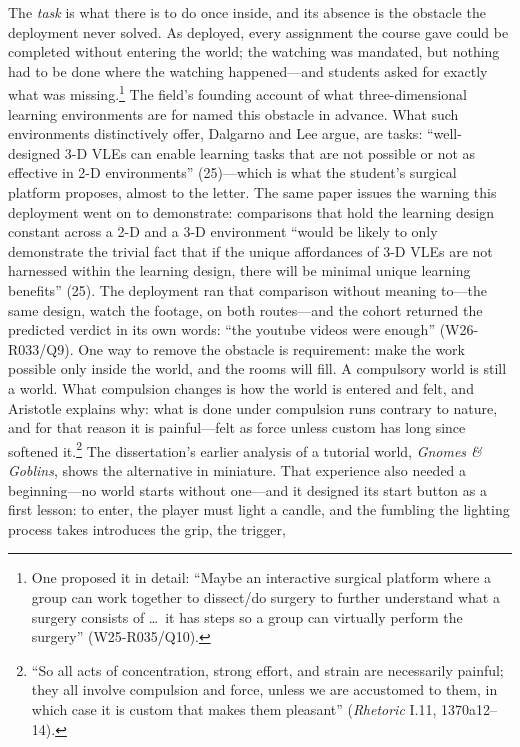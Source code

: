 The \textit{task} is what there is to do once inside, and its absence
is the obstacle the deployment never solved. As deployed, every
assignment the course gave could be completed without entering the
world; the watching was mandated, but nothing had to be done where the
watching happened---and students asked for exactly what was
missing.\footnote{One proposed it in detail: ``Maybe an interactive
surgical platform where a group can work together to dissect/do
surgery to further understand what a surgery consists of \ldots\ it
has steps so a group can virtually perform the surgery''
(W25-R035/Q10).} The field's founding account of what
three-dimensional learning environments are for named this obstacle in
advance. What such environments distinctively offer, Dalgarno and Lee
argue, are tasks: ``well-designed 3-D VLEs can enable learning tasks
that are not possible or not as effective in 2-D environments''
(25)---which is what the student's surgical platform proposes, almost
to the letter. The same paper issues the warning this deployment went
on to demonstrate: comparisons that hold the learning design constant
across a 2-D and a 3-D environment ``would be likely to only
demonstrate the trivial fact that if the unique affordances of 3-D
VLEs are not harnessed within the learning design, there will be
minimal unique learning benefits'' (25). The deployment ran that
comparison without meaning to---the same design, watch the footage, on
both routes---and the cohort returned the predicted verdict in its own
words: ``the youtube videos were enough'' (W26-R033/Q9). One way to
remove the obstacle is requirement: make
the work possible only inside the world, and the rooms will fill. A
compulsory world is still a world. What compulsion changes is how the
world is entered and felt, and Aristotle explains why: what is done under
compulsion runs contrary to nature, and for that reason it is
painful---felt as force unless custom has long since softened
it.\footnote{``So all acts of concentration, strong effort, and strain
are necessarily painful; they all involve compulsion and force, unless
we are accustomed to them, in which case it is custom that makes them
pleasant'' (\textit{Rhetoric} I.11, 1370a12--14).} The dissertation's
earlier analysis of a tutorial world, \textit{Gnomes \& Goblins},
shows the alternative in miniature. That experience also needed a
beginning---no world starts without one---and it designed its start
button as a first lesson: to enter, the player must light a candle,
and the fumbling the lighting process takes introduces the grip, the trigger,
